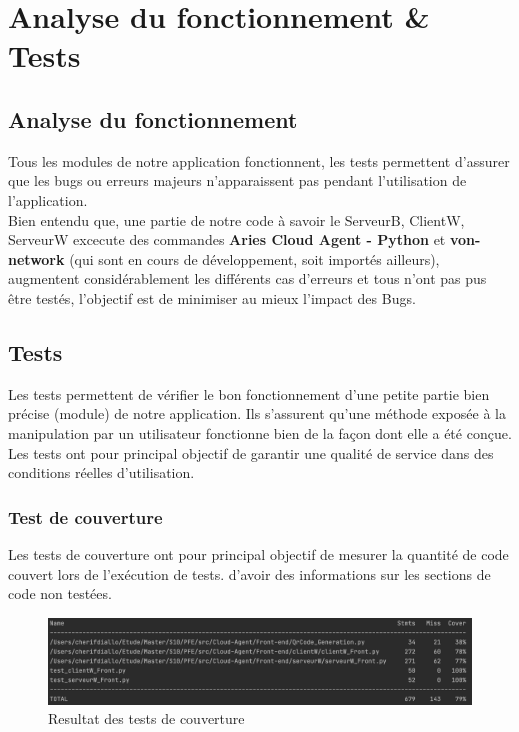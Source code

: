 \documentclass[12pt, openany]{report}
\begin{document}
\section{Analyse du fonctionnement \& Tests}
\noindent 
\begin{flushleft}

\subsection{Analyse du fonctionnement}
Tous les modules de notre application fonctionnent, les tests permettent d'assurer que les bugs ou erreurs majeurs n'apparaissent pas pendant l'utilisation de l'application.\\
Bien entendu que, une partie de notre code à savoir le ServeurB, ClientW, ServeurW excecute des commandes \textbf{Aries Cloud Agent - Python} et \textbf{von-network} (qui sont en cours de développement, soit importés ailleurs), augmentent considérablement les différents cas d'erreurs et tous n'ont pas pus être testés, l’objectif est de minimiser au mieux l’impact des Bugs.
\subsection{Tests}
Les tests permettent de vérifier le bon fonctionnement d’une petite partie bien précise (module) de notre application. Ils s'assurent qu'une méthode exposée à la manipulation par un utilisateur fonctionne bien de la façon dont elle a été conçue.
Les tests ont pour principal objectif de garantir une qualité de service dans des conditions réelles d'utilisation.
\subsubsection{Test de couverture}
Les tests de couverture ont pour principal objectif de mesurer la quantité de code couvert lors de l'exécution de tests. d'avoir des informations sur les sections de code non testées.
\begin{figure}[H]
\includegraphics[scale=0.5]{coverage.png}
\centering
\caption{Resultat des tests de couverture}
\end{figure}


\end{flushleft}
\end{document}
